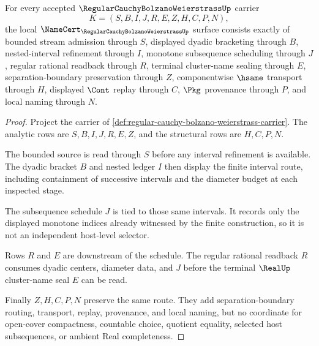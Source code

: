 \begin{theorem}
\label{thm:regular-cauchy-bolzano-weierstrass-namecert-obligations}
For every accepted $\RegularCauchyBolzanoWeierstrassUp$ carrier
$$
K=(S,B,I,J,R,E,Z,H,C,P,N),
$$
the local $\NameCert_{\RegularCauchyBolzanoWeierstrassUp}$ surface consists exactly of bounded stream admission through $S$, displayed dyadic bracketing through $B$, nested-interval refinement through $I$, monotone subsequence scheduling through $J$, regular rational readback through $R$, terminal cluster-name sealing through $E$, separation-boundary preservation through $Z$, componentwise $\hsame$ transport through $H$, displayed $\Cont$ replay through $C$, $\Pkg$ provenance through $P$, and local naming through $N$.
\end{theorem}
\begin{proof}
Project the carrier of \autoref{def:regular-cauchy-bolzano-weierstrass-carrier}. The analytic rows are $S,B,I,J,R,E,Z$, and the structural rows are $H,C,P,N$.

The bounded source is read through $S$ before any interval refinement is available. The dyadic bracket $B$ and nested ledger $I$ then display the finite interval route, including containment of successive intervals and the diameter budget at each inspected stage.

The subsequence schedule $J$ is tied to those same intervals. It records only the displayed monotone indices already witnessed by the finite construction, so it is not an independent host-level selector.

Rows $R$ and $E$ are downstream of the schedule. The regular rational readback $R$ consumes dyadic centers, diameter data, and $J$ before the terminal $\RealUp$ cluster-name seal $E$ can be read.

Finally $Z,H,C,P,N$ preserve the same route. They add separation-boundary routing, transport, replay, provenance, and local naming, but no coordinate for open-cover compactness, countable choice, quotient equality, selected host subsequences, or ambient Real completeness.
\end{proof}

